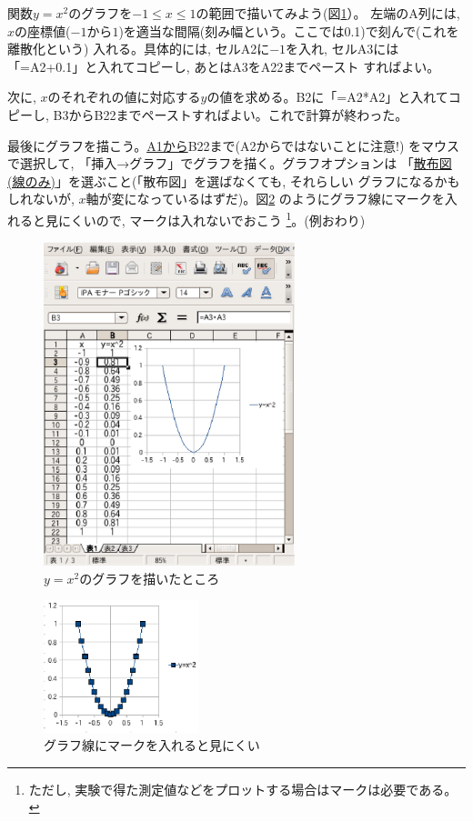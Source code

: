 \begin{exmpl}\label{exmpl:graph_y=x^2}
関数$y=x^2$のグラフを$-1\leq x \leq 1$の範囲で描いてみよう(図\ref{fig:PC_graph0}）。
左端のA列には, $x$の座標値($-1$から$1$)を適当な間隔(刻み幅という。ここでは0.1)で刻んで(これを離散化という)
入れる。具体的には, セルA2に$-1$を入れ, セルA3には「=A2+0.1」と入れてコピーし, あとはA3をA22までペースト
すればよい。

次に, $x$のそれぞれの値に対応する$y$の値を求める。B2に「=A2*A2」と入れてコピーし, 
B3からB22までペーストすればよい。これで計算が終わった。

最後にグラフを描こう。\underline{A1から}B22まで(A2からではないことに注意!)
をマウスで選択して, 「挿入→グラフ」でグラフを描く。グラフオプションは
「\underline{散布図(線のみ)}」を選ぶこと(「散布図」を選ばなくても, それらしい
グラフになるかもしれないが, $x$軸が変になっているはずだ)。図\ref{fig:PC_graph1}
のようにグラフ線にマークを入れると見にくいので, マークは入れないでおこう
\footnote{ただし, 実験で得た測定値などをプロットする場合はマークは必要である。}。(例おわり)
\end{exmpl}
\begin{figure}
    \centering
    \includegraphics[width=7.3cm]{PC_graph0.eps}
    \caption{$y=x^2$のグラフを描いたところ\label{fig:PC_graph0}}
\end{figure}

\begin{figure}
    \centering
    \includegraphics[width=4.5cm]{PC_graph1.eps}
    \caption{グラフ線にマークを入れると見にくい\label{fig:PC_graph1}}
\end{figure}

